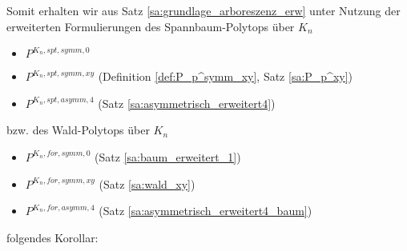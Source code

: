 \documentclass[10p,a4paper,BCOR = 12mm, DIV=15]{scrbook}
\begin{document}
{Somit erhalten wir aus Satz \ref{sa:grundlage_arboreszenz_erw} unter Nutzung der erweiterten Formulierungen des Spannbaum-Polytops über $K_n$
\begin{itemize}
\item $P^{K_n, spt, symm, 0}$
\item $P^{K_n, spt, symm, xy}$ (Definition \ref{def:P_p^symm_xy}, Satz \ref{sa:P_p^xy})
\item $P^{K_n, spt, asymm, 4}$ (Satz \ref{sa:asymmetrisch_erweitert4})
\end{itemize}
bzw. des Wald-Polytops über $K_n$
\begin{itemize}
\item $P^{K_n, for, symm, 0}$ (Satz \ref{sa:baum_erweitert_1})
\item $P^{K_n, for, symm, xy}$ (Satz \ref{sa:wald_xy})
\item $P^{K_n, for, asymm, 4}$ (Satz \ref{sa:asymmetrisch_erweitert4_baum})
\end{itemize}
folgendes Korollar:

}
\end{document}
